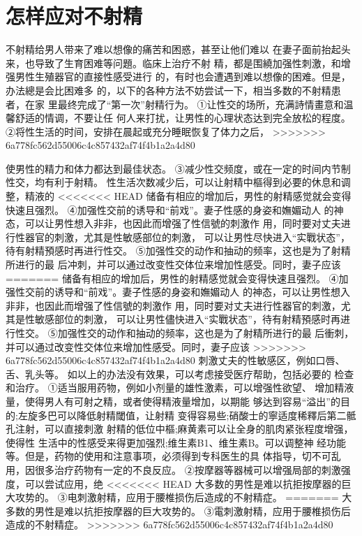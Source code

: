 \documentclass[12pt,UTF8]{ctexbook}
\begin{document}
\section{怎样应对不射精}
不射精给男人带来了难以想像的痛苦和困惑，甚至让他们难以
在妻子面前抬起头来，也导致了生育困难等问題。临床上治疗不射
精，都是围繞加强性刺激，和增强男性生殖器官的直接性感受进行
的，有时也会遭遇到难以想像的困难。但是，办法總是会比困难多
的，以下的各种方法不妨尝试一下，相当多数的不射精患者，在家
里最终完成了“第一次”射精行为。
①让性交的场所，充满詩情畫意和温馨舒适的情调，不要让任
何人来打扰，让男性的心理状态达到完全放松的程度。
②将性生活的时间，安排在晨起或充分睡眠恢复了体力之后，
>>>>>>> 6a778fc562d55006c4c857432af74f4b1a2a4d80

使男性的精力和体力都达到最佳状态。
③减少性交频度，或在一定的时间内节制性交，均有利于射精。
性生活次数减少后，可以让射精中樞得到必要的休息和调整，精液的
<<<<<<< HEAD
储备有相应的增加后，男性的射精感觉就会变得快速且强烈。
④加强性交前的诱导和“前戏”。妻子性感的身姿和嫵媚动人
的神态，可以让男性想入非非，也因此而增强了性信號的刺激作
用，同时要对丈夫进行性器官的刺激，尤其是性敏感部位的刺激，
可以让男性尽快进入“实戰状态”，待有射精預感时再进行性交。
⑤加强性交的动作和抽动的频率，这也是为了射精所进行的最
后冲刺，并可以通过改变性交体位来增加性感受。同时，妻子应该
=======
储备有相应的增加后，男性的射精感觉就会变得快速且强烈。
④加强性交前的诱导和“前戏”。妻子性感的身姿和嫵媚动人
的神态，可以让男性想入非非，也因此而增强了性信號的刺激作
用，同时要对丈夫进行性器官的刺激，尤其是性敏感部位的刺激，
可以让男性儘快进入“实戰状态”，待有射精預感时再进行性交。
⑤加强性交的动作和抽动的频率，这也是为了射精所进行的最
后衝刺，并可以通过改变性交体位来增加性感受。同时，妻子应该
>>>>>>> 6a778fc562d55006c4c857432af74f4b1a2a4d80
刺激丈夫的性敏感区，例如口唇、舌、乳头等。
如以上的办法没有效果，可以考虑接受医疗帮助，包括必要的
检查和治疗。
①适当服用药物，例如小剂量的雄性激素，可以增强性欲望、
增加精液量，使得男人有可射之精，或者使得精液量增加，以期能
够达到容易“溢出”的目的;左旋多巴可以降低射精閾值，让射精
变得容易些;硝酸士的寧适度稀釋后第二骶孔注射，可以直接刺激
射精的低位中樞;麻黄素可以让全身的肌肉紧张程度增强，使得性
生活中的性感受来得更加强烈;维生素B1、维生素B。可以调整神
经功能等。但是，药物的使用和注意事项，必须得到专科医生的具
体指导，切不可乱用，因很多治疗药物有一定的不良反应。
②按摩器等器械可以增强局部的刺激强度，可以尝试应用，绝
<<<<<<< HEAD
大多数的男性是难以抗拒按摩器的巨大攻势的。
③电刺激射精，应用于腰椎损伤后造成的不射精症。
=======
大多数的男性是难以抗拒按摩器的巨大攻势的。
③電刺激射精，应用于腰椎损伤后造成的不射精症。
>>>>>>> 6a778fc562d55006c4c857432af74f4b1a2a4d80
\end{document}
